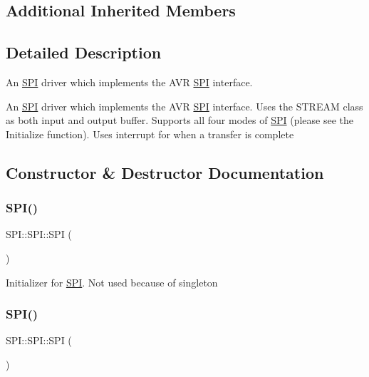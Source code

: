 \subsection*{Additional Inherited Members}


\subsection{Detailed Description}
An \hyperlink{class_s_p_i_1_1_s_p_i}{S\+PI} driver which implements the A\+VR \hyperlink{class_s_p_i_1_1_s_p_i}{S\+PI} interface. 

An \hyperlink{class_s_p_i_1_1_s_p_i}{S\+PI} driver which implements the A\+VR \hyperlink{class_s_p_i_1_1_s_p_i}{S\+PI} interface. Uses the S\+T\+R\+E\+AM class as both input and output buffer. Supports all four modes of \hyperlink{class_s_p_i_1_1_s_p_i}{S\+PI} (please see the Initialize function). Uses interrupt for when a transfer is complete 

\subsection{Constructor \& Destructor Documentation}
\hypertarget{class_s_p_i_1_1_s_p_i_ac1ee59045bad0aa3dc8574519b0f6ed9}{}\label{class_s_p_i_1_1_s_p_i_ac1ee59045bad0aa3dc8574519b0f6ed9} 
\subsubsection{\texorpdfstring{S\+P\+I()}{SPI()}\hspace{0.1cm}{\footnotesize\ttfamily [1/2]}}
{\footnotesize\ttfamily S\+P\+I\+::\+S\+P\+I\+::\+S\+PI (\begin{DoxyParamCaption}{ }\end{DoxyParamCaption})\hspace{0.3cm}{\ttfamily [private]}}

Initializer for \hyperlink{class_s_p_i_1_1_s_p_i}{S\+PI}. Not used because of singleton \hypertarget{class_s_p_i_1_1_s_p_i_a3892e59b84bed60d98ce7ee8909d1744}{}\label{class_s_p_i_1_1_s_p_i_a3892e59b84bed60d98ce7ee8909d1744} 
\subsubsection{\texorpdfstring{S\+P\+I()}{SPI()}\hspace{0.1cm}{\footnotesize\ttfamily [2/2]}}
{\footnotesize\ttfamily S\+P\+I\+::\+S\+P\+I\+::\+S\+PI (\begin{DoxyParamCaption}\item[{const \hyperlink{class_s_p_i_1_1_s_p_i}{S\+PI} \&}]{ }\end{DoxyParamCaption})\hspace{0.3cm}{\ttfamily [delete]}}

